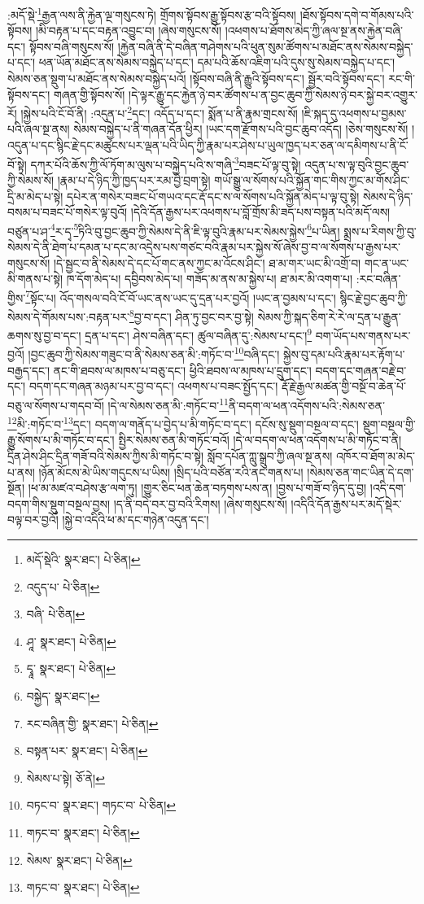 :མདོ་སྡེ་\footnote{མདོ་སྡེའི་  སྣར་ཐང་།  པེ་ཅིན། }རྒྱན་ལས་ནི་རྐྱེན་ལྔ་གསུངས་ཏེ། གྲོགས་སྟོབས་རྒྱུ་སྟོབས་རྩ་བའི་སྟོབས། །ཐོས་སྟོབས་དགེ་བ་གོམས་པའི་སྟོབས། །མི་བརྟན་པ་དང་བརྟན་འབྱུང་བ། །ཞེས་གསུངས་སོ། །འཕགས་པ་ཐོགས་མེད་ཀྱི་ཞལ་སྔ་ནས་རྐྱེན་བཞི་དང་། སྟོབས་བཞི་གསུངས་སོ། །རྐྱེན་བཞི་ནི་དེ་བཞིན་གཤེགས་པའི་ཕུན་སུམ་ཚོགས་པ་མཐོང་ནས་སེམས་བསྐྱེད་པ་དང་། ཕན་ཡོན་མཐོང་ནས་སེམས་བསྐྱེད་པ་དང་། དམ་པའི་ཆོས་འཇིག་པའི་དུས་སུ་སེམས་བསྐྱེད་པ་དང་། སེམས་ཅན་སྡུག་པ་མཐོང་ནས་སེམས་བསྐྱེད་པའོ། །སྟོབས་བཞི་ནི་རྒྱུའི་སྟོབས་དང་། སྦྱོར་བའི་སྟོབས་དང་། རང་གི་སྟོབས་དང་། གཞན་གྱི་སྟོབས་སོ། །དེ་ལྟར་རྒྱུ་དང་རྐྱེན་ཉེ་བར་ཚོགས་པ་ན་བྱང་ཆུབ་ཀྱི་སེམས་ཉེ་བར་སྐྱེ་བར་འགྱུར་རོ། །སྐྱེས་པའི་ངོ་བོ་ནི། :འདུན་པ་\footnote{འདུད་པ་  པེ་ཅིན། }དང་། འདོད་པ་དང་། སྨོན་པ་ནི་རྣམ་གྲངས་སོ། །ཇི་སྐད་དུ་འཕགས་པ་བྱམས་པའི་ཞལ་སྔ་ནས། སེམས་བསྐྱེད་པ་ནི་གཞན་དོན་ཕྱིར། །ཡང་དག་རྫོགས་པའི་བྱང་ཆུབ་འདོད། །ཅེས་གསུངས་སོ། །འདུན་པ་དང་སྙིང་རྗེ་དང་མཚུངས་པར་ལྡན་པའི་ཡིད་ཀྱི་རྣམ་པར་ཤེས་པ་ཡུལ་ཁྱད་པར་ཅན་ལ་དམིགས་པ་ནི་ངོ་བོ་སྟེ། དཀར་པོའི་ཆོས་ཀྱི་ལོ་ཏོག་མ་ལུས་པ་བསྐྱེད་པའི་ས་གཞི་\footnote{བཞི་  པེ་ཅིན། }བཟང་པོ་ལྟ་བུ་སྟེ། འདུན་པ་ས་ལྟ་བུའི་བྱང་ཆུབ་ཀྱི་སེམས་སོ། །རྣམ་པ་དེ་ཉིད་ཀྱི་ཁྱད་པར་རམ་བྱེ་བྲག་སྟེ། གཡོ་སྒྱུ་ལ་སོགས་པའི་སྐྱོན་གང་གིས་ཀྱང་མ་གོས་ཤིང་དྲི་མ་མེད་པ་སྟེ། དཔེར་ན་གསེར་བཟང་པོ་གཡའ་དང་རྡོ་དང་ས་ལ་སོགས་པའི་སྐྱོན་མེད་པ་ལྟ་བུ་སྟེ། སེམས་དེ་ཉིད་བསམ་པ་བཟང་པོ་གསེར་ལྟ་བུའོ། །དེའི་དོན་རྒྱས་པར་འཕགས་པ་བློ་གྲོས་མི་ཟད་པས་བསྟན་པའི་མདོ་ལས། བཙུན་པ་ཤ་\footnote{ཤཱ་  སྣར་ཐང་།  པེ་ཅིན། }ར་དྭ་\footnote{དྭཱ་  སྣར་ཐང་།  པེ་ཅིན། }ཏིའི་བུ་བྱང་ཆུབ་ཀྱི་སེམས་དེ་ནི་ཇི་ལྟ་བུའི་རྣམ་པར་སེམས་སྐྱེས་\footnote{བསྐྱེད་  སྣར་ཐང་། }པ་ཡིན། སྨྲས་པ་རིགས་ཀྱི་བུ་སེམས་དེ་ནི་ཐེག་པ་དམན་པ་དང་མ་འདྲེས་པས་གཙང་བའི་རྣམ་པར་སྐྱེས་སོ་ཞེས་བྱ་བ་ལ་སོགས་པ་རྒྱས་པར་གསུངས་སོ། །དེ་སྦྱང་བ་ནི་སེམས་དེ་དང་པོ་གང་ནས་ཀྱང་མ་འོངས་ཤིང་། ཐ་མ་གར་ཡང་མི་འགྲོ་བ། གང་ན་ཡང་མི་གནས་པ་སྟེ། ཁ་དོག་མེད་པ། དབྱིབས་མེད་པ། གཟོད་མ་ནས་མ་སྐྱེས་པ། ཐ་མར་མི་འགག་པ། :རང་བཞིན་གྱིས་\footnote{རང་བཞིན་གྱི་  སྣར་ཐང་།  པེ་ཅིན། }སྟོང་པ། འོད་གསལ་བའི་ངོ་བོ་ཡང་ནས་ཡང་དུ་དྲན་པར་བྱའོ། །ཡང་ན་བྱམས་པ་དང་། སྙིང་རྗེ་བྱང་ཆུབ་ཀྱི་སེམས་དེ་གོམས་པས་:བརྟན་པར་\footnote{བསྟན་པར་  སྣར་ཐང་།  པེ་ཅིན། }བྱ་བ་དང་། ཤིན་ཏུ་བྱང་བར་བྱ་སྟེ། སེམས་ཀྱི་སྐད་ཅིག་རེ་རེ་ལ་དྲན་པ་རྒྱུན་ཆགས་སུ་བྱ་བ་དང་། དྲན་པ་དང་། ཤེས་བཞིན་དང་། ཚུལ་བཞིན་དུ་:སེམས་པ་དང་།\footnote{སེམས་པ་སྟེ།  ཅོ་ནེ། } བག་ཡོད་པས་གནས་པར་བྱའོ། །བྱང་ཆུབ་ཀྱི་སེམས་གཟུང་བ་ནི་སེམས་ཅན་མི་:གཏོང་བ་\footnote{བཏང་བ་  སྣར་ཐང་། གཏང་བ་  པེ་ཅིན། }བཞི་དང་། སྐྱེས་བུ་དམ་པའི་རྣམ་པར་རྟོག་པ་བརྒྱད་དང་། ནང་གི་ཐབས་ལ་མཁས་པ་བཅུ་དང་། ཕྱིའི་ཐབས་ལ་མཁས་པ་དྲུག་དང་། བདག་དང་གཞན་བརྗེ་བ་དང་། བདག་དང་གཞན་མཉམ་པར་བྱ་བ་དང་། འཕགས་པ་བཟང་སྤྱོད་དང་། རྡོ་རྗེ་རྒྱལ་མཚན་གྱི་བསྔོ་བ་ཆེན་པོ་བཅུ་ལ་སོགས་པ་གདབ་བོ། །དེ་ལ་སེམས་ཅན་མི་:གཏོང་བ་\footnote{གཏང་བ་  སྣར་ཐང་།  པེ་ཅིན། }ནི་བདག་ལ་ཕན་འདོགས་པའི་:སེམས་ཅན་\footnote{སེམས་  སྣར་ཐང་།  པེ་ཅིན། }མི་:གཏོང་བ་\footnote{གཏང་བ་  སྣར་ཐང་།  པེ་ཅིན། }དང་། བདག་ལ་གནོད་པ་བྱེད་པ་མི་གཏོང་བ་དང་། དངོས་སུ་སྡུག་བསྔལ་བ་དང་། སྡུག་བསྔལ་གྱི་རྒྱུ་སོགས་པ་མི་གཏོང་བ་དང་། སྤྱིར་སེམས་ཅན་མི་གཏོང་བའོ། །དེ་ལ་བདག་ལ་ཕན་འདོགས་པ་མི་གཏོང་བ་ནི། དྲིན་ཤེས་ཤིང་དྲིན་གཟོ་བའི་སེམས་ཀྱིས་མི་གཏོང་བ་སྟེ། སློབ་དཔོན་ཀླུ་སྒྲུབ་ཀྱི་ཞལ་སྔ་ནས། འཁོར་བ་ཐོག་མ་མེད་པ་ནས། །ཉོན་མོངས་མེ་ཡིས་གདུངས་པ་ཡིས། །སྲིད་པའི་བཙོན་རའི་ནང་གནས་པ། །སེམས་ཅན་གང་ཡིན་དེ་དག་སྔོན། །ཕ་མ་མཛའ་བཤེས་རྩ་ལག་ཏུ། །གྱུར་ཅིང་ཕན་ཆེན་བཏགས་པས་ན། །བྱས་པ་གཟོ་བ་ཉིད་དུ་བྱ། །འདི་དག་བདག་གིས་སྡུག་བསྔལ་བྱས། །ད་ནི་བདེ་བར་བྱ་བའི་རིགས། །ཞེས་གསུངས་སོ། །འདིའི་དོན་རྒྱས་པར་མདོ་སྡེར་བལྟ་བར་བྱའོ། །སྐྱེ་བ་འདིའི་ཕ་མ་དང་གཉེན་འདུན་དང་། 